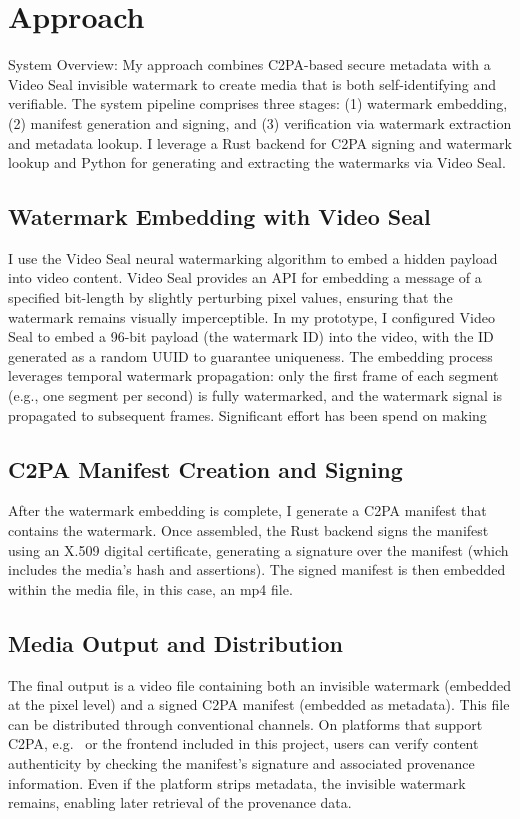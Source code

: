 \documentclass[12pt, technote]{IEEEtran}
\begin{document}
\section{Approach}
System Overview: My approach combines C2PA-based secure metadata with a Video Seal invisible watermark to create media that is both self-identifying and verifiable. The system pipeline comprises three stages: (1) watermark embedding, (2) manifest generation and signing, and (3) verification via watermark extraction and metadata lookup. I leverage a Rust backend for C2PA signing and watermark lookup and Python for generating and extracting the watermarks via Video Seal.

\subsection{Watermark Embedding with Video Seal}
I use the Video Seal neural watermarking algorithm to embed a hidden payload into video content. Video Seal provides an API for embedding a message of a specified bit-length by slightly perturbing pixel values, ensuring that the watermark remains visually imperceptible. In my prototype, I configured Video Seal to embed a 96-bit payload (the watermark ID) into the video, with the ID generated as a random UUID to guarantee uniqueness. The embedding process leverages temporal watermark propagation: only the first frame of each segment (e.g., one segment per second) is fully watermarked, and the watermark signal is propagated to subsequent frames. Significant effort has been spend on making 

\subsection{C2PA Manifest Creation and Signing}
After the watermark embedding is complete, I generate a C2PA manifest that contains the watermark.
Once assembled, the Rust backend signs the manifest using an X.509 digital certificate, generating a signature over the manifest (which includes the media’s hash and assertions). The signed manifest is then embedded within the media file, in this case, an mp4 file.

\subsection{Media Output and Distribution}
The final output is a video file containing both an invisible watermark (embedded at the pixel level) and a signed C2PA manifest (embedded as metadata). This file can be distributed through conventional channels. On platforms that support C2PA, e.g.~\cite{contentcredentialsverify} or the frontend included in this project, users can verify content authenticity by checking the manifest’s signature and associated provenance information. Even if the platform strips metadata, the invisible watermark remains, enabling later retrieval of the provenance data.
\end{document}
